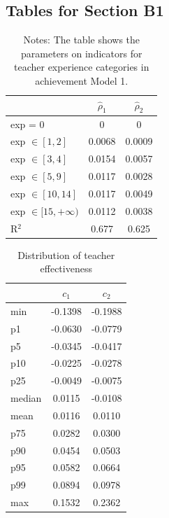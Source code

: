 \documentclass[notitlepage,12pt]{article}%
\begin{document}
\subsection*{Tables for Section B1}

\begin{table}[h]
\caption{Estimated parameters of teacher effectiveness}%
\label{tab:c12_exp}
\begin{center}%
\begin{tabular}
[c]{lcc}\hline\hline
& \multicolumn{1}{c}{$\hat{\rho}_{1}$} & \multicolumn{1}{c}{$\hat{\rho}_{2}$%
}\\\hline
exp = 0 & 0 & 0\\
exp $\in[1,2]$ & 0.0068 & 0.0009\\
exp $\in[3,4]$ & 0.0154 & 0.0057\\
exp $\in[5,9]$ & 0.0117 & 0.0028\\
exp $\in[10,14]$ & 0.0117 & 0.0049\\
exp $\in[15,+\infty)$ & 0.0112 & 0.0038\\\hline
R$^{2}$ & 0.677 & 0.625\\\hline\hline
\end{tabular}
\end{center}
\caption*{{\footnotesize Notes: The table shows the parameters on
indicators for teacher experience categories in achievement Model 1.}}\end{table}

\begin{table}[h]
\caption{Distribution of teacher effectiveness}%
\label{tab:contr}
\begin{center}%
\begin{tabular}
[c]{lcc}\hline\hline
& \multicolumn{1}{c}{$c_{1}$} & \multicolumn{1}{c}{$c_{2}$}\\\hline
min & -0.1398 & -0.1988\\
p1 & -0.0630 & -0.0779\\
p5 & -0.0345 & -0.0417\\
p10 & -0.0225 & -0.0278\\
p25 & -0.0049 & -0.0075\\
median & 0.0115 & -0.0108\\
mean & 0.0116 & 0.0110\\
p75 & 0.0282 & 0.0300\\
p90 & 0.0454 & 0.0503\\
p95 & 0.0582 & 0.0664\\
p99 & 0.0894 & 0.0978\\
max & 0.1532 & 0.2362\\\hline\hline
\end{tabular}
\end{center}
\end{table}
\end{document}

